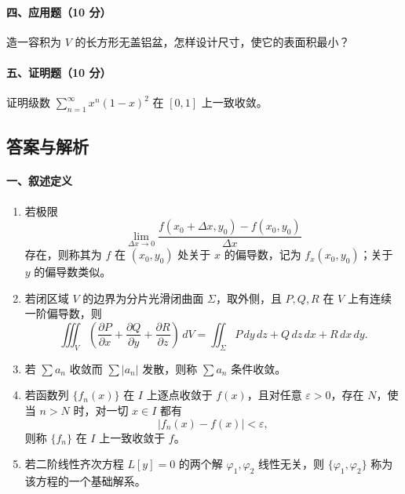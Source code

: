 \paragraph{四、应用题（10 分）}
造一容积为 $V$ 的长方形无盖铝盆，怎样设计尺寸，使它的表面积最小？

\paragraph{五、证明题（10 分）}
证明级数 $\displaystyle \sum_{n=1}^\infty x^n(1-x)^2$ 在 $[0,1]$ 上一致收敛。

\subsection{答案与解析}

\paragraph{一、叙述定义}
\begin{enumerate}
  \item 若极限
  \[
    \lim_{\Delta x\to 0}\frac{f(x_0+\Delta x,y_0)-f(x_0,y_0)}{\Delta x}
  \]
  存在，则称其为 $f$ 在 $(x_0,y_0)$ 处关于 $x$ 的偏导数，记为 $f_x(x_0,y_0)$；关于 $y$ 的偏导数类似。
  \item 若闭区域 $V$ 的边界为分片光滑闭曲面 $\Sigma$，取外侧，且 $P,Q,R$ 在 $V$ 上有连续一阶偏导数，则
  \[
    \iiint_V\left(\frac{\partial P}{\partial x}+\frac{\partial Q}{\partial y}+\frac{\partial R}{\partial z}\right)\,dV
    =
    \iint_\Sigma P\,dy\,dz+Q\,dz\,dx+R\,dx\,dy .
  \]
  \item 若 $\sum a_n$ 收敛而 $\sum |a_n|$ 发散，则称 $\sum a_n$ 条件收敛。
  \item 若函数列 $\{f_n(x)\}$ 在 $I$ 上逐点收敛于 $f(x)$，且对任意 $\varepsilon>0$，存在 $N$，使当 $n>N$ 时，对一切 $x\in I$ 都有
  \[
    |f_n(x)-f(x)|<\varepsilon,
  \]
  则称 $\{f_n\}$ 在 $I$ 上一致收敛于 $f$。
  \item 若二阶线性齐次方程 $L[y]=0$ 的两个解 $\varphi_1,\varphi_2$ 线性无关，则 $\{\varphi_1,\varphi_2\}$ 称为该方程的一个基础解系。
\end{enumerate}

